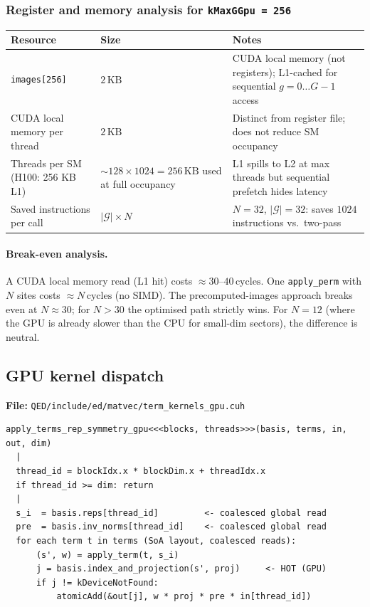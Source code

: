 \documentclass[11pt,a4paper]{article}
\begin{document}
\subsubsection{Register and memory analysis for \texttt{kMaxGGpu = 256}}

\begin{center}
\begin{tabular}{@{}llp{6cm}@{}}
\toprule
Resource & Size & Notes \\
\midrule
\texttt{images[256]} & $2\,\mathrm{KB}$ &
  CUDA local memory (not registers); L1-cached for sequential $g=0\ldots G-1$ access \\
CUDA local memory per thread & $2\,\mathrm{KB}$ & Distinct from register file;
  does not reduce SM occupancy \\
Threads per SM (H100: 256 KB L1) & $\sim 128\!\times\!1024 = 256\,\mathrm{KB}$ used at full occupancy &
  L1 spills to L2 at max threads but sequential prefetch hides latency \\
Saved instructions per call & $|\mathcal{G}| \times N$ &
  $N=32$, $|\mathcal{G}|=32$: saves $1024$ instructions vs.\ two-pass \\
\bottomrule
\end{tabular}
\end{center}

\paragraph{Break-even analysis.}
A CUDA local memory read (L1 hit) costs $\approx 30$--$40\,\mathrm{cycles}$.
One \texttt{apply\_perm} with $N$ sites costs $\approx N\,\mathrm{cycles}$
(no SIMD).  The precomputed-images approach breaks even at $N \approx 30$;
for $N > 30$ the optimised path strictly wins.  For $N=12$ (where the GPU is
already slower than the CPU for small-dim sectors), the difference is neutral.

\subsection{GPU kernel dispatch}

\textbf{File:} \texttt{QED/include/ed/matvec/term\_kernels\_gpu.cuh}

\begin{lstlisting}[style=pseudo, caption={CUDA rep-symmetry matvec kernel}]
apply_terms_rep_symmetry_gpu<<<blocks, threads>>>(basis, terms, in, out, dim)
  |
  thread_id = blockIdx.x * blockDim.x + threadIdx.x
  if thread_id >= dim: return
  |
  s_i  = basis.reps[thread_id]         <- coalesced global read
  pre  = basis.inv_norms[thread_id]    <- coalesced global read
  for each term t in terms (SoA layout, coalesced reads):
      (s', w) = apply_term(t, s_i)
      j = basis.index_and_projection(s', proj)     <- HOT (GPU)
      if j != kDeviceNotFound:
          atomicAdd(&out[j], w * proj * pre * in[thread_id])
\end{lstlisting}
\end{document}
